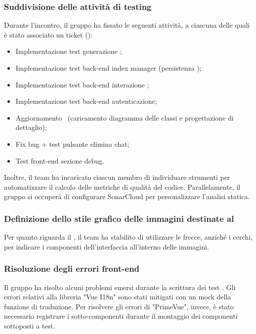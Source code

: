 \subsubsection{Suddivisione delle attività di testing}
\par Durante l'incontro, il gruppo ha fissato le seguenti attività, a ciascuna delle quali è stato associato un ticket  ():
\begin{itemize}
	\item Implementazione test  generazione ;
	\item Implementazione test back-end index manager (persistenza );
	\item Implementazione test back-end interazione ;
	\item Implementazione test back-end autenticazione;
	\item Aggiornamento \ST\ (caricamento diagramma delle classi e progettazione di dettaglio);
	\item Fix bug  + test pulsante elimina chat;
	\item Test front-end sezione debug.
\end{itemize}

\vspace{0.5\baselineskip}
\par Inoltre, il team ha incaricato ciascun membro di individuare strumenti per automatizzare il calcolo delle metriche di qualità del codice. Parallelamente, il gruppo si occuperà di configurare SonarCloud per personalizzare l'analisi statica.

\subsubsection{Definizione dello stile grafico delle immagini destinate al \MU}
\par Per quanto riguarda il \MU, il team ha stabilito di utilizzare le frecce, anziché i cerchi, per indicare i componenti dell'interfaccia all'interno delle immagini.

\subsubsection{Risoluzione degli errori front-end}
\par Il gruppo ha risolto alcuni problemi emersi durante la scrittura dei test . Gli errori relativi alla libreria "Vue I18n" sono stati mitigati con un mock della funzione di traduzione. Per risolvere gli errori di "PrimeVue", invece, è stato necessario registrare i sotto-componenti durante il montaggio dei componenti sottoposti a test.